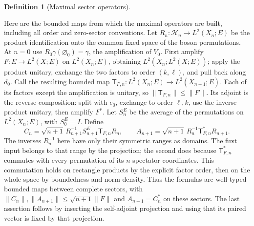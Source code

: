 \documentclass[11pt,a4paper]{article}
\theoremstyle{definition}
\newtheorem{definition}[theorem]{Definition}
\theoremstyle{remark}
\newcommand{\proofid}[1]{\par\smallskip{\normalfont\scriptsize\color{inkblue}Stable ID: \nolinkurl{#1}}\par\smallskip}
\begin{document}
\begin{definition}[Maximal sector operators]\label{fock:generalized}
\proofid{fock:generalized}
\par{}\par\smallskip

Here are the bounded maps from which the maximal operators are
built, including all order and zero-sector conventions. Let
$R_n:\mathcal H_n\to L^2(X_n;E)$ be the product identification
onto the common fixed space of the boson permutations. At $n=0$
use $R_0\gamma(\varnothing_0)=\gamma$, the amplification of $V_0$.
First amplify $F:E\to L^2(X;E)$ on
$L^2(X_n;E)$, obtaining $L^2(X_n;L^2(X;E))$; apply the
product unitary, exchange the two factors to order $(k,\ell)$,
and pull back along $d_0$. Call the resulting bounded map
$\mathsf T_{F,n}:L^2(X_n;E)\to L^2(X_{n+1};E)$.
Each of its factors except the amplification is unitary, so
$\|\mathsf T_{F,n}\|\leq\|F\|$. Its adjoint is the reverse composition:
split with $e_0$, exchange to order $\ell,k$, use the inverse
product unitary, then amplify $F^*$.
Let $S_n^E$ be the average of the permutations on $L^2(X_n;E)$,
with $S_0^E=I$. Define
\[
 C_n=\sqrt{n+1}\,R_{n+1}^{-1}S_{n+1}^E\mathsf T_{F,n}R_n,
 \qquad
 A_{n+1}=\sqrt{n+1}\,R_n^{-1}\mathsf T_{F,n}^*R_{n+1}.
\]
The inverses $R_n^{-1}$ here have only their symmetric ranges
as domains. The first input belongs to that range by the
projection; the second does because $\mathsf T_{F,n}^*$ commutes with every
permutation of its $n$ spectator coordinates. This commutation
holds on rectangle products by the explicit factor order, then
on the whole space by boundedness and norm density. Thus the
formulas are well-typed bounded maps between complete sectors,
with $\|C_n\|,\|A_{n+1}\|\leq\sqrt{n+1}\|F\|$ and
$A_{n+1}=C_n^*$ on these sectors. The last assertion follows by
inserting the self-adjoint projection and using that its paired
vector is fixed by that projection.


\end{definition}
\end{document}
